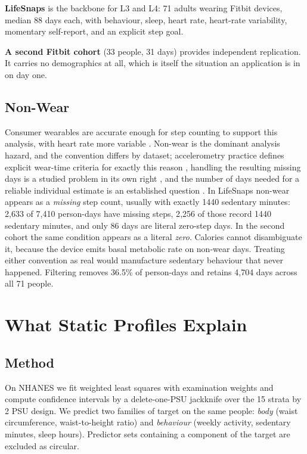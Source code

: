 \documentclass[conference]{IEEEtran}
\begin{document}
\textbf{LifeSnaps} \cite{yfantidou2022lifesnaps} is the backbone for L3 and L4: 71 adults wearing Fitbit devices, median 88 days each, with behaviour, sleep, heart rate, heart-rate variability, momentary self-report, and an explicit step goal.

\textbf{A second Fitbit cohort} \cite{furberg2016fitbit} (33 people, 31 days) provides independent replication. It carries no demographics at all, which is itself the situation an application is in on day one.

\subsection{Non-Wear}
Consumer wearables are accurate enough for step counting to support this analysis, with heart rate more variable \cite{fuller2020wearables, bai2018hr}. Non-wear is the dominant analysis hazard, and the convention differs by dataset; accelerometry practice defines explicit wear-time criteria for exactly this reason \cite{troiano2008, choi2011nonwear}, handling the resulting missing days is a studied problem in its own right \cite{lee2018missing}, and the number of days needed for a reliable individual estimate is an established question \cite{matthews2012best, tudorlocke2005days}. In LifeSnaps non-wear appears as a \textit{missing} step count, usually with exactly 1440 sedentary minutes: 2{,}633 of 7{,}410 person-days have missing steps, 2{,}256 of those record 1440 sedentary minutes, and only 86 days are literal zero-step days. In the second cohort the same condition appears as a literal \textit{zero}. Calories cannot disambiguate it, because the device emits basal metabolic rate on non-wear days. Treating either convention as real would manufacture sedentary behaviour that never happened. Filtering removes 36.5\% of person-days and retains 4{,}704 days across all 71 people.

\section{What Static Profiles Explain}

\subsection{Method}
On NHANES we fit weighted least squares with examination weights and compute confidence intervals by a delete-one-PSU jackknife over the 15 strata by 2 PSU design. We predict two families of target on the same people: \textit{body} (waist circumference, waist-to-height ratio) and \textit{behaviour} (weekly activity, sedentary minutes, sleep hours). Predictor sets containing a component of the target are excluded as circular.
\end{document}
